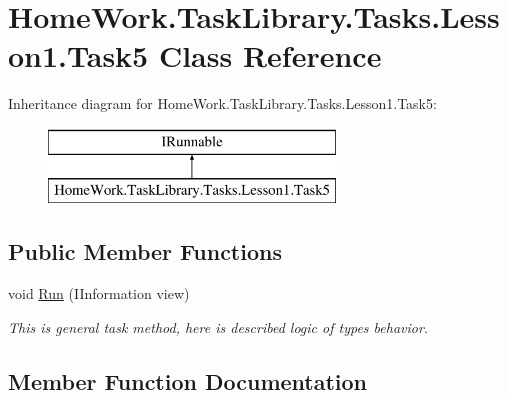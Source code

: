 \hypertarget{class_home_work_1_1_task_library_1_1_tasks_1_1_lesson1_1_1_task5}{}\section{Home\+Work.\+Task\+Library.\+Tasks.\+Lesson1.\+Task5 Class Reference}
\label{class_home_work_1_1_task_library_1_1_tasks_1_1_lesson1_1_1_task5}
Inheritance diagram for Home\+Work.\+Task\+Library.\+Tasks.\+Lesson1.\+Task5\+:\begin{figure}[H]
\begin{center}
\leavevmode
\includegraphics[height=2.000000cm]{class_home_work_1_1_task_library_1_1_tasks_1_1_lesson1_1_1_task5}
\end{center}
\end{figure}
\subsection*{Public Member Functions}
\begin{DoxyCompactItemize}
\item 
void \mbox{\hyperlink{class_home_work_1_1_task_library_1_1_tasks_1_1_lesson1_1_1_task5_ae5102e7b309bf1010ae88ac27b5ed4cb}{Run}} (I\+Information view)
\begin{DoxyCompactList}\small\item\em This is general task method, here is described logic of types behavior. \end{DoxyCompactList}\end{DoxyCompactItemize}


\subsection{Member Function Documentation}
\mbox{\label{class_home_work_1_1_task_library_1_1_tasks_1_1_lesson1_1_1_task5_ae5102e7b309bf1010ae88ac27b5ed4cb}} 
